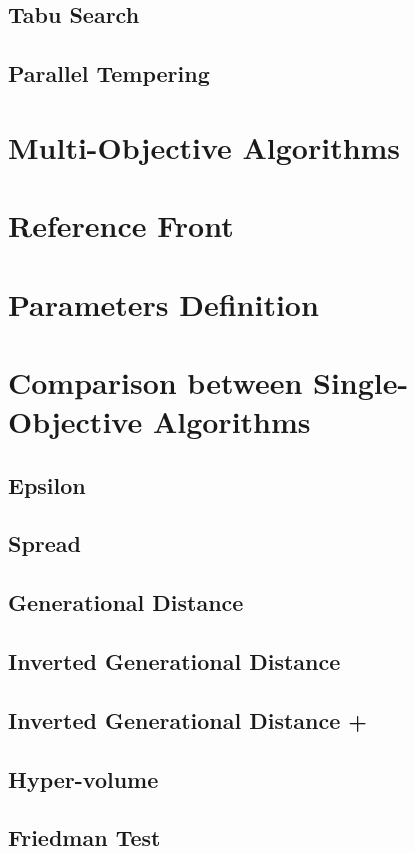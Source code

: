 \subsection{Tabu Search} 
\subsection{Parallel Tempering} 

\section{Multi-Objective Algorithms}

\section{Reference Front}

\section{Parameters Definition}

\section{Comparison between Single-Objective Algorithms}

\subsection{Epsilon}
\subsection{Spread}
\subsection{Generational Distance}
\subsection{Inverted Generational Distance}
\subsection{Inverted Generational Distance +}
\subsection{Hyper-volume}
\subsection{Friedman Test}
